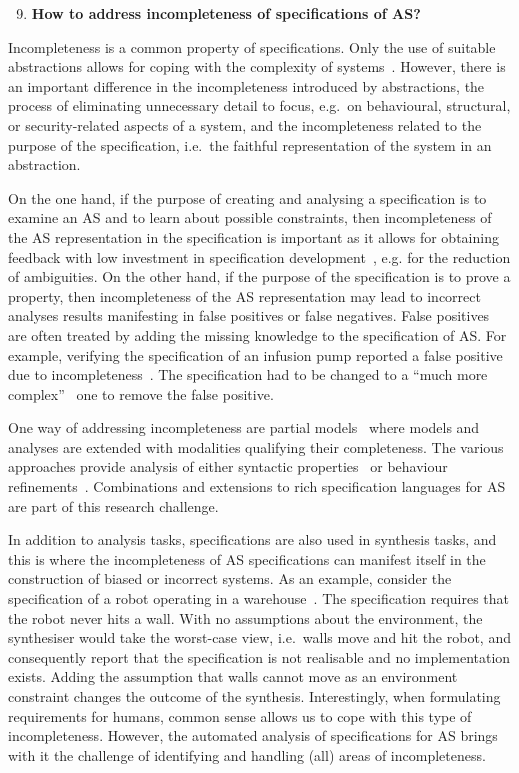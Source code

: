\documentclass[sigconf,nonacm]{acmart}%
\begin{document}
\begin{enumerate}[leftmargin=0.5cm]
		\setcounter{enumi}{8}
	\item \textbf{How to address incompleteness of specifications of AS?}
\end{enumerate}
Incompleteness is a common property of specifications. Only the use of suitable abstractions allows for coping with the complexity of systems~\citep{Kramer07}. However, there is an important difference in the incompleteness introduced by abstractions, the process of eliminating unnecessary detail to focus, e.g.\ on behavioural, structural, or security-related aspects of a system, and the incompleteness related to the purpose of the specification, i.e.\ the faithful representation of the system in an abstraction.

On the one hand, if the purpose of creating and analysing a specification is to examine an AS and to learn about possible constraints, then incompleteness of the AS representation in the specification is important as it allows for obtaining feedback with low investment in specification development~\cite{Jackson19}, e.g. for the reduction of ambiguities. 
%
On the other hand, if the purpose of the specification is to prove a property, then incompleteness of the AS representation may lead to incorrect analyses results manifesting in false positives or false negatives. False positives are often treated by adding the missing knowledge to the specification of AS. For example, verifying the specification of an infusion pump reported a false positive due to incompleteness~\cite{HarrisonMCC17}. The specification had to be changed to a ``much more complex''~\cite{HarrisonMCC17} one to remove the false positive.

One way of addressing incompleteness are partial models~\cite{WeiGC11,FamelisSC12,FischbeinDBCU12} where models and analyses are extended with modalities qualifying their completeness. The various approaches provide analysis of either syntactic properties~\cite{FamelisSC12} or behaviour refinements~\cite{WeiGC11,FischbeinDBCU12}. Combinations and extensions to rich specification languages for AS are part of this research challenge.

In addition to analysis tasks, specifications are also used in synthesis tasks, and this is where the incompleteness of AS specifications can manifest itself in the construction of biased or incorrect systems. 
As an example, consider the specification of a robot operating in a warehouse~\cite{MaozR18robot}. The specification requires that the robot never hits a wall. With no assumptions about the environment, the synthesiser would take the worst-case view, i.e.\ walls move and hit the robot, and consequently report that the specification is not realisable and no implementation exists. Adding the assumption that walls cannot move as an environment constraint changes the outcome of the synthesis. 
Interestingly, when formulating requirements for humans, common sense allows us to cope with this type of incompleteness. 
%
However, the automated analysis of specifications for AS brings with it the challenge of identifying and handling (all) areas of incompleteness.
\end{document}
